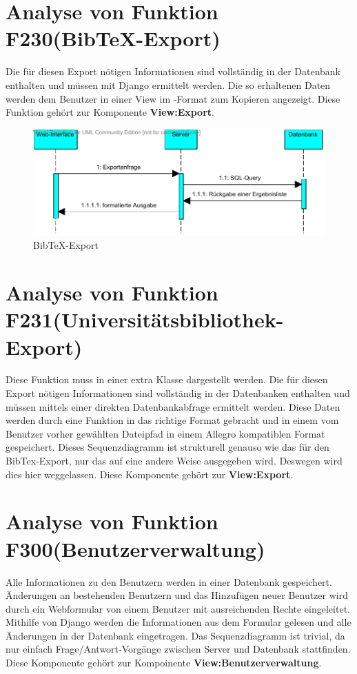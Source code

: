 \section{Analyse von Funktion F230(Bib\TeX -Export)}
Die für diesen Export nötigen Informationen sind vollständig in der Datenbank enthalten und müssen mit Django ermittelt werden. Die so erhaltenen Daten werden dem Benutzer in einer View im \BibTeX -Format zum Kopieren angezeigt. Diese Funktion gehört zur Komponente \textbf{View:Export}.

\begin{figure}[h]
\includegraphics[width=0.8\linewidth]{bilder/Seq-BibTex.pdf}
\caption[BibTeX-Export]{BibTeX-Export}
\label{BibTeX-Export}
\end{figure}

\section{Analyse von Funktion F231(Universitätsbibliothek-Export)}
Diese Funktion muss in einer extra Klasse dargestellt werden. Die für diesen Export nötigen Informationen sind vollständig in der Datenbanken enthalten und müssen mittels einer direkten Datenbankabfrage ermittelt werden. Diese Daten werden durch eine Funktion in das richtige Format gebracht und in einem vom Benutzer vorher gewählten Dateipfad in einem Allegro kompatiblen Format gespeichert. Dieses Sequenzdiagramm ist strukturell genauso wie das für den BibTex-Export, nur das auf eine andere Weise ausgegeben wird. Deswegen wird dies hier weggelassen. Diese Komponente gehört zur \textbf{View:Export}.

\section{Analyse von Funktion F300(Benutzerverwaltung)}
Alle Informationen zu den Benutzern werden in einer Datenbank gespeichert. Änderungen an bestehenden Benutzern und das Hinzufügen neuer Benutzer wird durch ein Webformular von einem Benutzer mit ausreichenden Rechte eingeleitet. Mithilfe von Django werden die Informationen aus dem Formular gelesen und alle Änderungen in der Datenbank eingetragen. Das Sequenzdiagramm ist trivial, da nur einfach Frage/Antwort-Vorgänge zwischen Server und Datenbank stattfinden. Diese Komponente gehört zur Kompoinente \textbf{View:Benutzerverwaltung}.

